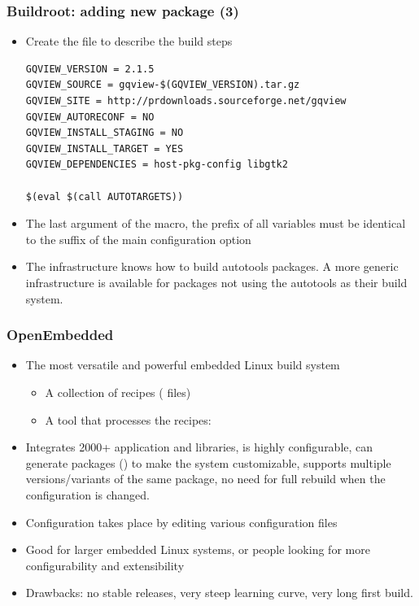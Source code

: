 \begin{frame}[fragile]
  \frametitle{Buildroot: adding new package (3)}
  \begin{itemize}
  \item Create the  file to describe the build steps
\scriptsize
\begin{block}{}
\begin{verbatim}
GQVIEW_VERSION = 2.1.5
GQVIEW_SOURCE = gqview-$(GQVIEW_VERSION).tar.gz
GQVIEW_SITE = http://prdownloads.sourceforge.net/gqview
GQVIEW_AUTORECONF = NO
GQVIEW_INSTALL_STAGING = NO
GQVIEW_INSTALL_TARGET = YES
GQVIEW_DEPENDENCIES = host-pkg-config libgtk2

$(eval $(call AUTOTARGETS))
\end{verbatim}
\end{block}
\normalsize
  \item The last argument of the  macro, the prefix
    of all variables must be identical to the suffix of the main
    configuration option 
  \item The  infrastructure knows how to build
    autotools packages. A more generic 
    infrastructure is available for packages not using the autotools
    as their build system.
  \end{itemize}
\end{frame}

\begin{frame}
  \frametitle{OpenEmbedded}
  \begin{itemize}
  \item The most versatile and powerful embedded Linux build system
    \begin{itemize}
    \item A collection of recipes ( files)
    \item A tool that processes the recipes: 
    \end{itemize}
  \item Integrates 2000+ application and libraries, is highly
    configurable, can generate packages () to make the system
    customizable, supports multiple versions/variants of the same
    package, no need for full rebuild when the configuration is
    changed.
  \item Configuration takes place by editing various configuration
    files
  \item Good for larger embedded Linux systems, or people looking for
    more configurability and extensibility
  \item Drawbacks: no stable releases, very steep learning curve, very
    long first build.
  \end{itemize}
\end{frame}


